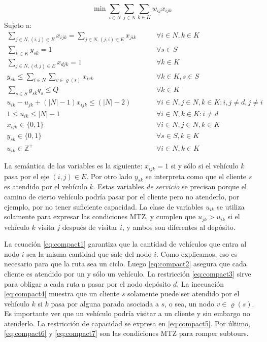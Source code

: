 \begin{equation}
    \min \sum_{i \in N} \sum_{j \in N} \sum_{k \in K} w_{ij} x_{ijk}
\end{equation}
Sujeto a:
\begin{align}
    \sum_{j \in N, (i, j) \in E}{x_{ijk}} = \sum_{j \in N, (j, i) \in E}{x_{jik}} \qquad & \forall {i \in N, k \in K} \label{eq:compact1} \\
    \sum_{k \in K} y_{sk} = 1 \qquad & \forall {s \in S} \label{eq:compact2} \\
    \sum_{j \in N, (d, j) \in E}{x_{djk}} = 1 \qquad & \forall {k \in K} \label{eq:compact3} \\ 
    y_{sk} \leq \sum_{i \in N}\sum_{v \in \varrho(s)}{x_{ivk}} \qquad & \forall {k \in K, s \in S} \label{eq:compact4} \\
    \sum_{s \in S}{y_{sk}q_s} \le Q \qquad & \forall {k \in K} \label{eq:compact5} \\
u_{ik} - u_{jk} + (|N| - 1)x_{ijk} \leq (|N| - 2)  \qquad & \forall {i \in N, j \in N, k \in K: i,j \neq d, j \neq i} \label{eq:compact6} \\
1 \leq u_{ik} \leq |N| - 1  \qquad & \forall {i \in N, k \in K: i \neq d} \label{eq:compact7} \\
x_{ijk} \in \{0, 1\} \qquad & \forall {i \in N, j \in N, k \in K} \label{eq:compact8} \\
y_{sk} \in \{0, 1\} \qquad & \forall {s \in S, k \in K} \label{eq:compact9}\\
u_{ik} \in \mathbb{Z}^{+} \qquad & \forall {i \in N, k \in K} \label{eq:compact10}
\end{align}

La semántica de las variables es la siguiente: $x_{ijk} = 1$ si y sólo si el vehículo $k$ pasa por el eje $(i, j) \in E$. Por otro lado $y_{sk}$ se interpreta como que el cliente $s$ es atendido por el vehículo $k$. Estas variables \emph{de servicio} se precisan porque el camino de cierto vehículo podría pasar por el cliente pero no atenderlo, por ejemplo, por no tener suficiente capacidad. La clase de variables $u_{ik}$ se utiliza solamente para expresar las condiciones MTZ, y cumplen que $u_{jk} > u_{ik}$ si el vehículo $k$ visita $j$ después de visitar $i$, y ambos son diferentes al depósito. 

La ecuación \ref{eq:compact1} garantiza que la cantidad de vehículos que entra al nodo $i$ sea la misma cantidad que sale del nodo $i$. Como explicamos, eso es necesario para que la ruta sea un ciclo. Luego \ref{eq:compact2} asegura que cada cliente es atendido por un y sólo un vehículo. La restricción \ref{eq:compact3} sirve para obligar a cada ruta a pasar por el nodo depósito $d$. La inecuación \ref{eq:compact4} muestra que un cliente $s$ solamente puede ser atendido por el vehículo $k$ si $k$ pasa por alguna parada asociada a $s$, o sea, un nodo $v \in \varrho(s)$. Es importante ver que un vehículo podría visitar a un cliente y sin embargo no atenderlo. La restricción de capacidad se expresa en \ref{eq:compact5}. Por último, \ref{eq:compact6} y \ref{eq:compact7} son las condiciones MTZ para romper subtours.


